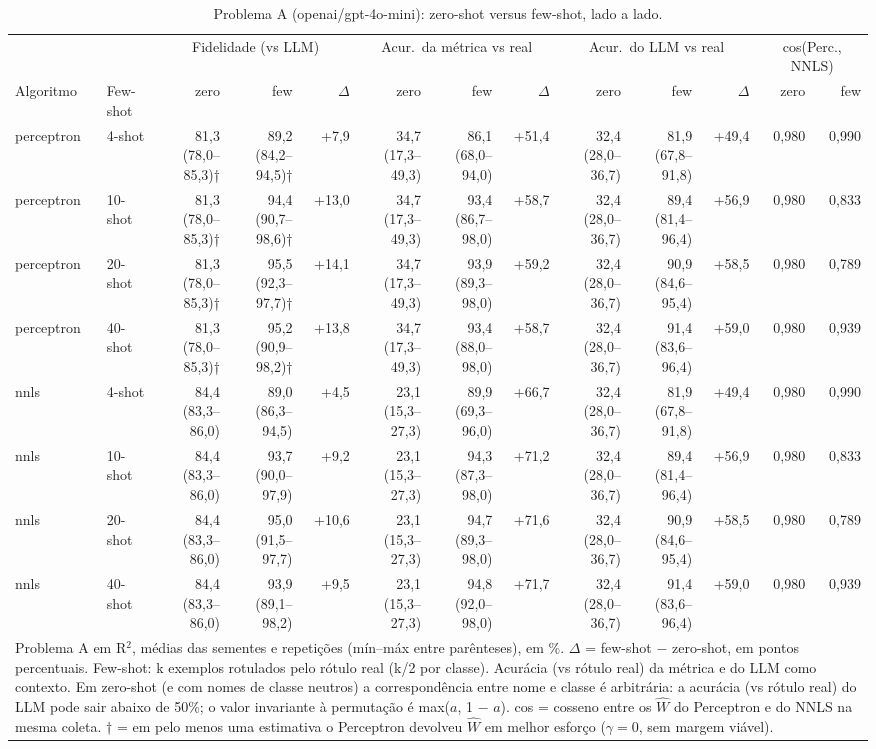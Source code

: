\begin{table}[htbp]
\centering
\footnotesize
\caption{Problema A (openai/gpt-4o-mini): zero-shot versus few-shot, lado a lado.}
\label{tab:T6_zero_few_A_gpt4mini}
\begin{tabular}{llrrrrrrrrrrr}
\toprule
 &  & \multicolumn{3}{c}{Fidelidade (vs LLM)} & \multicolumn{3}{c}{Acur.\ da métrica vs real} & \multicolumn{3}{c}{Acur.\ do LLM vs real} & \multicolumn{2}{c}{cos(Perc., NNLS)} \\ \cmidrule(lr){3-5} \cmidrule(lr){6-8} \cmidrule(lr){9-11} \cmidrule(lr){12-13}
Algoritmo & Few-shot & zero & few & $\Delta$ & zero & few & $\Delta$ & zero & few & $\Delta$ & zero & few \\
\midrule
perceptron & 4-shot & 81,3 (78,0–85,3)† & 89,2 (84,2–94,5)† & +7,9 & 34,7 (17,3–49,3) & 86,1 (68,0–94,0) & +51,4 & 32,4 (28,0–36,7) & 81,9 (67,8–91,8) & +49,4 & 0,980 & 0,990 \\
perceptron & 10-shot & 81,3 (78,0–85,3)† & 94,4 (90,7–98,6)† & +13,0 & 34,7 (17,3–49,3) & 93,4 (86,7–98,0) & +58,7 & 32,4 (28,0–36,7) & 89,4 (81,4–96,4) & +56,9 & 0,980 & 0,833 \\
perceptron & 20-shot & 81,3 (78,0–85,3)† & 95,5 (92,3–97,7)† & +14,1 & 34,7 (17,3–49,3) & 93,9 (89,3–98,0) & +59,2 & 32,4 (28,0–36,7) & 90,9 (84,6–95,4) & +58,5 & 0,980 & 0,789 \\
perceptron & 40-shot & 81,3 (78,0–85,3)† & 95,2 (90,9–98,2)† & +13,8 & 34,7 (17,3–49,3) & 93,4 (88,0–98,0) & +58,7 & 32,4 (28,0–36,7) & 91,4 (83,6–96,4) & +59,0 & 0,980 & 0,939 \\
\midrule
nnls & 4-shot & 84,4 (83,3–86,0) & 89,0 (86,3–94,5) & +4,5 & 23,1 (15,3–27,3) & 89,9 (69,3–96,0) & +66,7 & 32,4 (28,0–36,7) & 81,9 (67,8–91,8) & +49,4 & 0,980 & 0,990 \\
nnls & 10-shot & 84,4 (83,3–86,0) & 93,7 (90,0–97,9) & +9,2 & 23,1 (15,3–27,3) & 94,3 (87,3–98,0) & +71,2 & 32,4 (28,0–36,7) & 89,4 (81,4–96,4) & +56,9 & 0,980 & 0,833 \\
nnls & 20-shot & 84,4 (83,3–86,0) & 95,0 (91,5–97,7) & +10,6 & 23,1 (15,3–27,3) & 94,7 (89,3–98,0) & +71,6 & 32,4 (28,0–36,7) & 90,9 (84,6–95,4) & +58,5 & 0,980 & 0,789 \\
nnls & 40-shot & 84,4 (83,3–86,0) & 93,9 (89,1–98,2) & +9,5 & 23,1 (15,3–27,3) & 94,8 (92,0–98,0) & +71,7 & 32,4 (28,0–36,7) & 91,4 (83,6–96,4) & +59,0 & 0,980 & 0,939 \\
\bottomrule
\multicolumn{13}{p{0.95\linewidth}}{\footnotesize Problema A em R$^2$, médias das sementes e repetições (mín–máx entre parênteses), em \%. $\Delta$ = few-shot $-$ zero-shot, em pontos percentuais. Few-shot: k exemplos rotulados pelo rótulo real (k/2 por classe). Acurácia (vs rótulo real) da métrica e do LLM como contexto. Em zero-shot (e com nomes de classe neutros) a correspondência entre nome e classe é arbitrária: a acurácia (vs rótulo real) do LLM pode sair abaixo de 50\%; o valor invariante à permutação é max($a$, 1 $-$ $a$). cos = cosseno entre os $\hat{W}$ do Perceptron e do NNLS na mesma coleta. † = em pelo menos uma estimativa o Perceptron devolveu $\hat{W}$ em melhor esforço ($\gamma = 0$, sem margem viável).} \\
\end{tabular}
\end{table}
